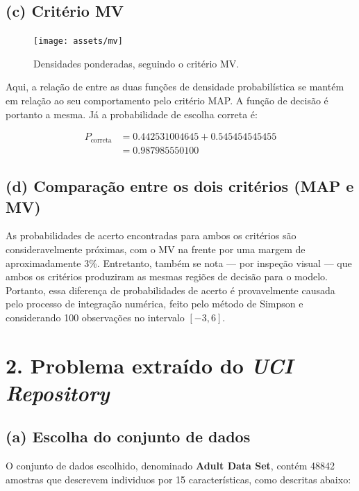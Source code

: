 \documentclass[12pt]{report}
\begin{document}
\subsection{(c) Critério MV}

\begin{figure}[H]
	\centering
	\texttt{[image: assets/mv]}
	\caption{Densidades ponderadas, seguindo o critério MV.}
	\label{fig:mv}
\end{figure}

Aqui, a relação de entre as duas funções de densidade probabilística se mantém em relação ao seu comportamento pelo critério MAP. A função de decisão é portanto a mesma. Já a probabilidade de escolha correta é:

\begin{align*}
	P_\text{correta} &= 0.442531004645 + 0.545454545455 \\
	&= 0.987985550100
\end{align*}

\subsection{(d) Comparação entre os dois critérios (MAP e MV)}

As probabilidades de acerto encontradas para ambos os critérios são consideravelmente próximas, com o MV na frente por uma margem de aproximadamente 3\%. Entretanto, também se nota --- por inspeção visual --- que ambos os critérios produziram as mesmas regiões de decisão para o modelo. Portanto, essa diferença de probabilidades de acerto é provavelmente causada pelo processo de integração numérica, feito pelo método de Simpson e considerando 100 observações no intervalo $[-3, 6]$.

\section{2. Problema extraído do \textit{UCI Repository}}

\subsection{(a) Escolha do conjunto de dados}

O conjunto de dados escolhido, denominado \textbf{Adult Data Set}, contém 48842 amostras que descrevem individuos por 15 características, como descritas abaixo:
		
\end{document}
